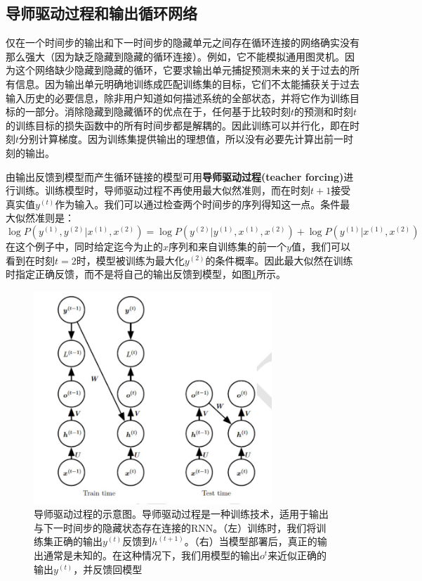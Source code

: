 \documentclass{ctexart}
\begin{document}
        \subsection{导师驱动过程和输出循环网络}
            仅在一个时间步的输出和下一时间步的隐藏单元之间存在循环连接的网络确实没有那么强大（因为缺乏隐藏到隐藏的循环连接）。例如，它不能模拟通用图灵机。因为这个网络缺少隐藏到隐藏的循环，它要求输出单元捕捉预测未来的关于过去的所有信息。因为输出单元明确地训练成匹配训练集的目标，它们不太能捕获关于过去输入历史的必要信息，除非用户知道如何描述系统的全部状态，并将它作为训练目标的一部分。消除隐藏到隐藏循环的优点在于，任何基于比较时刻$t$的预测和时刻$t$的训练目标的损失函数中的所有时间步都是解耦的。因此训练可以并行化，即在时刻$t$分别计算梯度。因为训练集提供输出的理想值，所以没有必要先计算出前一时刻的输出。

            由输出反馈到模型而产生循环链接的模型可用\textbf{导师驱动过程(teacher forcing)}进行训练。训练模型时，导师驱动过程不再使用最大似然准则，而在时刻$t+1$接受真实值$y^{(t)}$作为输入。我们可以通过检查两个时间步的序列得知这一点。条件最大似然准则是：
            \begin{equation}
                \log P(y^{(1)},y^{(2)}|x^{(1)},x^{(2)}) = \log P(y^{(2)}|y^{(1)},x^{(1)},x^{(2)}) + \log P(y^{(1)}|x^{(1)},x^{(2)})
                \label{e10.15}
            \end{equation}
            在这个例子中，同时给定迄今为止的$x$序列和来自训练集的前一个$y$值，我们可以看到在时刻$t=2$时，模型被训练为最大化$y^{(2)}$的条件概率。因此最大似然在训练时指定正确反馈，而不是将自己的输出反馈到模型，如图\ref{f10.6}所示。
            \begin{figure}[h]
                \centering
                \includegraphics[width=0.8\textwidth]{f6}
                \caption{导师驱动过程的示意图。导师驱动过程是一种训练技术，适用于输出与下一时间步的隐藏状态存在连接的RNN。（左）训练时，我们将训练集正确的输出$y^{(t)}$反馈到$h^{(t+1)}$。（右）当模型部署后，真正的输出通常是未知的。在这种情况下，我们用模型的输出$o^{t}$来近似正确的输出$y^{(t)}$，并反馈回模型}
                \label{f10.6}
            \end{figure}
\end{document}
